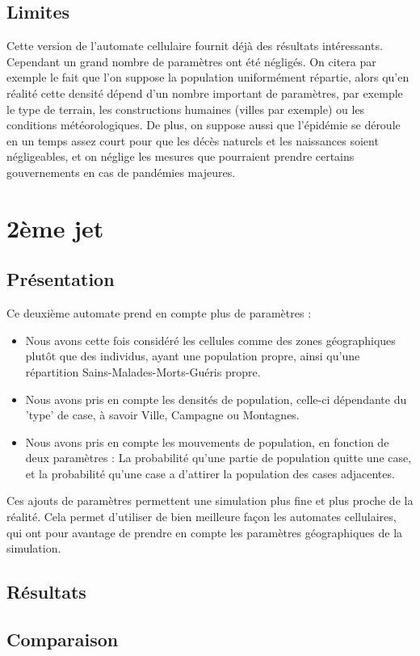 \documentclass{article}
\begin{document}
\subsection{Limites}
	Cette version de l'automate cellulaire fournit déjà des résultats intéressants. Cependant un grand nombre de paramètres ont été négligés. On citera par exemple le fait que l'on suppose la population uniformément répartie, alors qu'en réalité cette densité dépend d'un nombre important de paramètres, par exemple le type de terrain, les constructions humaines (villes par exemple) ou les conditions météorologiques. De plus, on suppose aussi que l'épidémie se déroule en un temps assez court pour que les décès naturels et les naissances soient négligeables, et on néglige les mesures que pourraient prendre certains gouvernements en cas de pandémies majeures.
	
	
	
\section{2ème jet}

\subsection{Présentation}
	Ce deuxième automate prend en compte plus de paramètres : 
	\begin{itemize}
	\item Nous avons cette fois considéré les cellules comme des zones géographiques plutôt que des individus, ayant une population propre, ainsi qu'une répartition Sains-Malades-Morts-Guéris propre.
	\item Nous avons pris en compte les densités de population, celle-ci dépendante du 'type' de case, à savoir Ville, Campagne ou Montagnes.
	\item Nous avons pris en compte les mouvements de population, en fonction de deux paramètres : La probabilité qu'une partie de population quitte une case, et la probabilité qu'une case a d'attirer la population des cases adjacentes.
	\end{itemize}
	
	Ces ajouts de paramètres permettent une simulation plus fine et plus proche de la réalité. Cela permet d'utiliser de bien meilleure façon les automates cellulaires, qui ont pour avantage de prendre en compte les paramètres géographiques de la simulation.


\subsection{Résultats}

\subsection{Comparaison}
\end{document}
